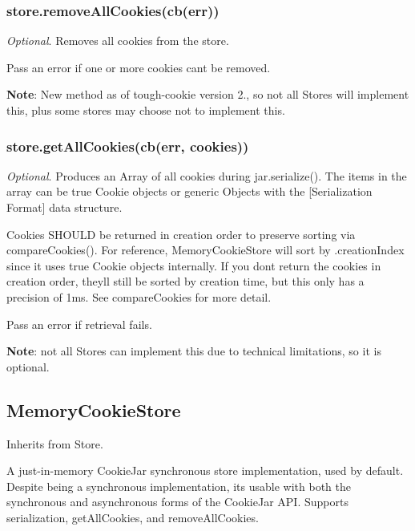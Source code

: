 \subsubsection*{{\ttfamily store.\+remove\+All\+Cookies(cb(err))}}

{\itshape Optional}. Removes all cookies from the store.

Pass an error if one or more cookies can\textquotesingle{}t be removed.

{\bfseries Note}\+: New method as of {\ttfamily tough-\/cookie} version 2., so not all Stores will implement this, plus some stores may choose not to implement this.

\subsubsection*{{\ttfamily store.\+get\+All\+Cookies(cb(err, cookies))}}

{\itshape Optional}. Produces an {\ttfamily Array} of all cookies during {\ttfamily jar.\+serialize()}. The items in the array can be true {\ttfamily Cookie} objects or generic {\ttfamily Object}s with the \mbox{[}Serialization Format\mbox{]} data structure.

Cookies S\+H\+O\+U\+LD be returned in creation order to preserve sorting via {\ttfamily compare\+Cookies()}. For reference, {\ttfamily Memory\+Cookie\+Store} will sort by {\ttfamily .creation\+Index} since it uses true {\ttfamily Cookie} objects internally. If you don\textquotesingle{}t return the cookies in creation order, they\textquotesingle{}ll still be sorted by creation time, but this only has a precision of 1ms. See {\ttfamily compare\+Cookies} for more detail.

Pass an error if retrieval fails.

{\bfseries Note}\+: not all Stores can implement this due to technical limitations, so it is optional.

\subsection*{Memory\+Cookie\+Store}

Inherits from {\ttfamily Store}.

A just-\/in-\/memory Cookie\+Jar synchronous store implementation, used by default. Despite being a synchronous implementation, it\textquotesingle{}s usable with both the synchronous and asynchronous forms of the {\ttfamily Cookie\+Jar} A\+PI. Supports serialization, {\ttfamily get\+All\+Cookies}, and {\ttfamily remove\+All\+Cookies}.


